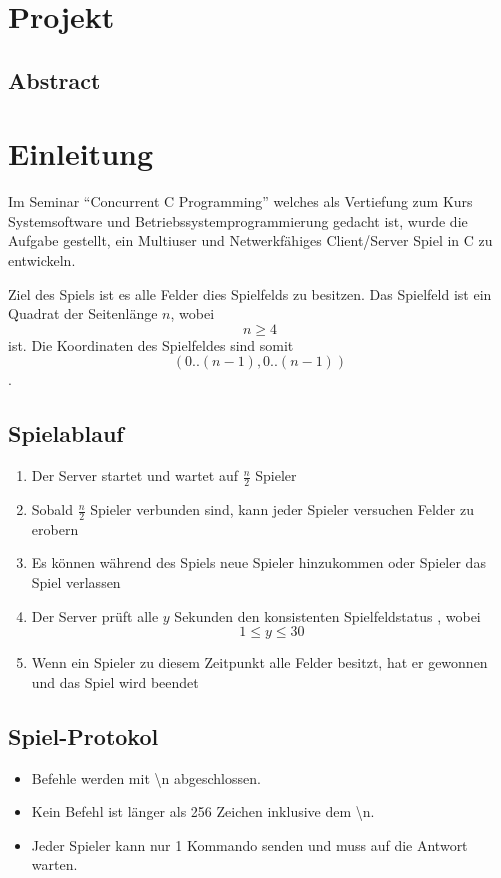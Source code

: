\chapter{Projekt}

\section{Abstract}
\label{abstract}


\chapter{Einleitung}
Im Seminar ``Concurrent C Programming'' welches als Vertiefung zum Kurs Systemsoftware und Betriebssystemprogrammierung gedacht ist, wurde die Aufgabe gestellt, ein Multiuser und Netwerkfähiges Client/Server Spiel in C zu entwickeln.

Ziel des Spiels ist es alle Felder dies Spielfelds zu besitzen. Das Spielfeld ist ein Quadrat der Seitenlänge $n$, wobei $$n \geq  4$$ ist. Die Koordinaten des Spielfeldes sind somit $$(0..(n-1), 0..(n-1))$$.

\section{Spielablauf}
\begin{enumerate}
	\item Der Server startet und wartet auf $\frac{n}{2}$ Spieler
	\item Sobald $\frac{n}{2}$ Spieler verbunden sind, kann jeder Spieler versuchen Felder zu erobern
	\item Es können während des Spiels neue Spieler hinzukommen oder Spieler das Spiel verlassen
	\item Der Server prüft alle $y$ Sekunden den konsistenten Spielfeldstatus , wobei $$1 \leq y \leq 30$$
	\item Wenn ein Spieler zu diesem Zeitpunkt alle Felder besitzt, hat er gewonnen und das Spiel wird beendet
\end{enumerate}

\section{Spiel-Protokol}
\begin{itemize}
	\item Befehle werden mit \textbackslash n abgeschlossen.
	\item Kein Befehl ist länger als 256 Zeichen inklusive dem \textbackslash n.
	\item Jeder Spieler kann nur 1 Kommando senden und muss auf die Antwort warten.
\end{itemize}

